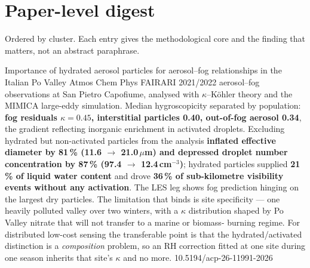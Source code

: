 \documentclass[10pt]{article}
\begin{document}
\vspace{3mm}
\section*{\sffamily\bfseries\color{Deep}Paper-level digest}
\vspace{-1.5mm}{\color{Amber}\rule{\linewidth}{1.1pt}}\vspace{1mm}

{\fontsize{7.4}{9}\selectfont\color{Slate}Ordered by cluster. Each entry gives the
methodological core and the finding that matters, not an abstract paraphrase.\par}


{Importance of hydrated aerosol particles for aerosol--fog relationships in the Italian Po Valley}
{Atmos Chem Phys}
{FAIRARI 2021/2022 aerosol--fog observations at San Pietro Capofiume, analysed with
$\kappa$--K\"ohler theory and the MIMICA large-eddy simulation. Median hygroscopicity
separated by population: \textbf{fog residuals $\kappa = 0.45$, interstitial particles
0.40, out-of-fog aerosol 0.34}, the gradient reflecting inorganic enrichment in activated
droplets. Excluding hydrated but non-activated particles from the analysis
\textbf{inflated effective diameter by 81\,\% (11.6 $\rightarrow$ 21.0\,$\mu$m) and
depressed droplet number concentration by 87\,\% (97.4 $\rightarrow$ 12.4\,cm$^{-3}$)};
hydrated particles supplied \textbf{21\,\% of liquid water content} and drove
\textbf{36\,\% of sub-kilometre visibility events without any activation}. The LES leg
shows fog prediction hinging on the largest dry particles. The limitation that binds is
site specificity --- one heavily polluted valley over two winters, with a $\kappa$
distribution shaped by Po Valley nitrate that will not transfer to a marine or biomass-
burning regime. For distributed low-cost sensing the transferable point is that the
hydrated/activated distinction is a \emph{composition} problem, so an RH correction
fitted at one site during one season inherits that site's $\kappa$ and no more.}
{10.5194/acp-26-11991-2026}
\end{document}
